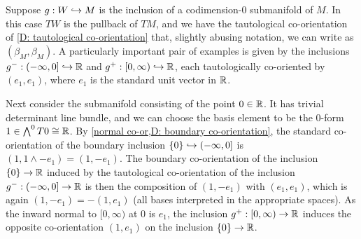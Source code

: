 \begin{example}\label{E: splitting example 1}
	Suppose $g:W\hookrightarrow M$ is the inclusion of a codimension-$0$ submanifold of $M$.
	In this case $TW$ is the pullback of $TM$, and we have the tautological co-orientation of \cref{D: tautological co-orientation} that, slightly abusing notation, we can write as $(\beta_M,\beta_M)$.
	A particularly important pair of examples is given by the inclusions $g^-:(-\infty, 0]\hookrightarrow \mathbb{R}$ and $g^+:[0,\infty)\hookrightarrow \mathbb{R}$, each tautologically co-oriented by $(e_1,e_1)$, where $e_1$ is the standard unit vector in $\mathbb{R}$.

	Next consider the submanifold consisting of the point $0\in \mathbb{R}$.
	It has trivial determinant line bundle, and we can choose the basis element to be the $0$-form $1\in \bigwedge^0 T0\cong \mathbb{R}$.
	By \cref{normal co-or,D: boundary co-orientation}, the standard co-orientation of the boundary inclusion $\{0\}\hookrightarrow (-\infty, 0]$ is $(1,1\wedge -e_1)=(1,-e_1)$.
	The boundary co-orientation of the inclusion $\{0\}\to \mathbb{R}$ induced by the tautological co-orientation of the inclusion $g^-:(-\infty, 0]\to \mathbb{R}$ is then the composition of $(1,-e_1)$ with $(e_1,e_1)$, which is again $(1,-e_1)=-(1,e_1)$ (all bases interpreted in the appropriate spaces).
	As the inward normal to $[0,\infty)$ at $0$ is $e_1$, the inclusion $g^+:[0,\infty)\to \mathbb{R}$ induces the opposite co-orientation $(1,e_1)$ on the inclusion $\{0\}\to \mathbb{R}$.
\end{example}

